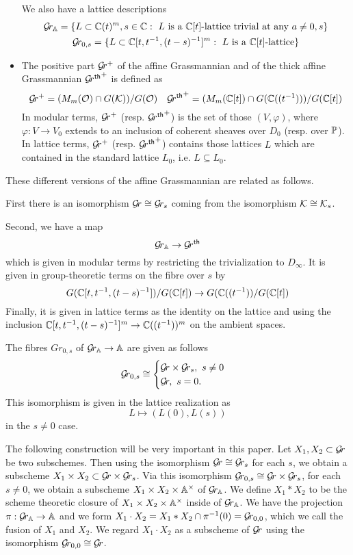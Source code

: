 \documentclass{article}
\begin{document}
\begin{itemize}
    We also have a lattice descriptions 
    {\small
    \begin{gather*}
    \Grbd = 
    \{ L \subset  \CC(t)^m, s \in \CC : \text{ $L$ is a $\CC[t]$-lattice 
    trivial at any $ a \ne 0, s$} \} \\
     \Gr_{0,s} = 
    \{ L \subset  \CC[t,t^{-1},(t-s)^{-1}]^m : \text{ $L$ is a $\CC[t]$-lattice} \}
    \end{gather*} }
    \item The positive part $ \Gr^+$ of the affine Grassmannian and of the thick affine Grassmannian ${\Grth}^+$ is defined as
    $$
    \Gr^+ = (M_m(\cO) \cap G(\cK)) / G(\cO) \quad {\Grth}^+ = (M_m(\CC[t]) \cap G(\CC((t^{-1}))) / G(\CC[t]) $$
    In modular terms, $\Gr^+$ (resp. ${\Grth}^+$) is the set of those $ (V, \varphi)$, where $ \varphi : V \rightarrow V_0 $ extends to an inclusion of coherent sheaves over $ D_0 $ (resp. over $ \PP$).  In lattice terms, $ \Gr^+$ (resp. ${\Grth}^+$) contains those lattices $L$ which are contained in the standard lattice $ L_0$, i.e. $ L \subseteq L_0$.
\end{itemize}

These different versions of the affine Grassmannian are related as follows.  

First there is an isomorphism $ \Gr \cong \Gr_s $ coming from the isomorphism $ \cK \cong \Ks$.

Second, we have a map $$ \Grbd \rightarrow \Grth $$ which is given in modular terms by restricting the trivialization to $ D_\infty$.  It is given in group-theoretic terms on the fibre over $ s $ by
$$
G(\CC[t, t^{-1}, (t-s)^{-1}])/ G(\CC[t]) \rightarrow G(\CC((t^{-1}))/G(\CC[t])
$$
Finally, it is given in lattice terms as the identity on the lattice and using the inclusion $\CC[t, t^{-1}, (t-s)^{-1}]^m \rightarrow \CC((t^{-1}))^m$ on the ambient spaces.

The fibres $ Gr_{0,s}$ of $ \Grbd \rightarrow \AA$ are given as follows
$$
\Gr_{0,s} \cong \begin{cases} \Gr \times \Gr_s, \  s \ne 0 \\
\Gr, \ s = 0.
\end{cases}
$$
This isomorphism is given in the lattice realization as
$$
L \mapsto (L(0), L(s))
$$
in the $ s \ne 0 $ case.


The following construction will be very important in this paper.  Let $ X_1, X_2 \subset \Gr$ be two subschemes.  Then using the isomorphism $ \Gr \cong \Gr_s $ for each $ s$, we obtain a subscheme $ X_1 \times X_2 \subset \Gr \times \Gr_s $.  Via this isomorphism $ \Gr_{0,s} \cong \Gr \times \Gr_s $,  for each $ s \ne 0$, we obtain a subscheme $ X_1 \times X_2 \times \AA^\times $  of $\Grbd$.  We define $ X_1 * X_2 $ to be the scheme theoretic closure of $ X_1 \times X_2 \times \AA^\times $ inside of $ \Grbd $.  We have the projection $ \pi: \Grbd \rightarrow \AA $ and we form $ X_1 \cdot X_2 = X_1 * X_2 \cap \pi^{-1}(0) = \Gr_{0,0} $, which we call the fusion of $ X_1 $ and $X_2$.  We regard $ X_1 \cdot X_2$ as a subscheme of $ \Gr $ using the isomorphism $\Gr_{0,0} \cong \Gr $.
\end{document}
